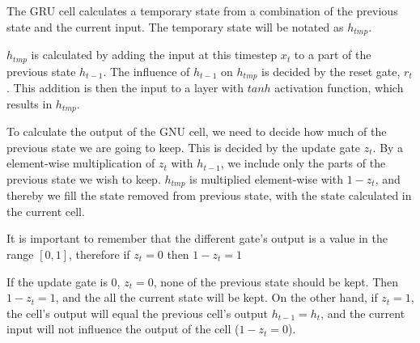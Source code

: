 The GRU cell calculates a temporary state from a combination of the previous state and the current input. The temporary state will be notated as $h_{tmp}$.

$h_{tmp}$ is calculated by adding the input at this timestep $x_t$ to a part of the previous state $h_{t-1}$. The influence of $h_{t-1}$ on $h_{tmp}$ is decided by the reset gate, $r_t$. This addition is then the input to a layer with $tanh$ activation function, which results in $h_{tmp}$.

To calculate the output of the GNU cell, we need to decide how much of the previous state we are going to keep. This is decided by the update gate $z_t$. By a element-wise multiplication of $z_t$ with $h_{t-1}$, we include only the parts of the previous state we wish to keep. $h_{tmp}$ is multiplied element-wise with $1 - z_t$, and thereby we fill the state removed from previous state, with the state calculated in the current cell.

It is important to remember that the different gate's output is a value in the range $[0, 1]$, therefore if $z_t = 0$ then $1 - z_t = 1$

If the update gate is 0, $z_t = 0$, none of the previous state should be kept. Then $1 - z_t = 1$, and the all the current state will be kept. On the other hand, if $z_t = 1$, the cell's output will equal the previous cell's output $h_{t-1} = h_t$, and the current input will not influence the output of the cell ($1 - z_t = 0$). \cite{kostadinov_understanding_2017}

